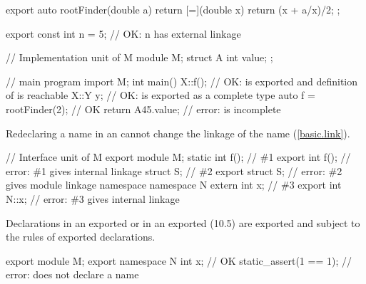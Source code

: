 \begin{std.txt}
\begin{example}
\begin{codeblock}
      export auto rootFinder(double a) {
        return [=](double x) { return (x + a/x)/2; };
      }

      export const int n = 5; // OK: n has external linkage
  
      // Implementation unit of M
      module M;
      struct A {
        int value;
      };
  
      // main program
      import M;
      int main() {
        X::f();                 // OK:  is exported and definition of  is reachable
        X::Y y;                 // OK:  is exported as a complete type
        auto f = rootFinder(2); // OK
        return A{45}.value;     // error:  is incomplete
      }
      \end{codeblock}
  \end{example}

  \alinea
  \enternote
  Redeclaring a name in an 
  cannot change the linkage of the name (\ref{basic.link}).
  \begin{example}
  \begin{codeblock}
    // Interface unit of M
    export module M;
    static int f();             // \#1
    export int f();             // error: \#1 gives internal linkage
    struct S;                   // \#2
    export struct S;            // error: \#2 gives module linkage
    namespace {
      namespace N {
        extern int x;           // \#3
      }
    }
    export int N::x;            // error: \#3 gives internal linkage
  \end{codeblock}
  \end{example}
  \exitnote


  \alinea
  \enternote
  Declarations in an exported  
  or in an exported  (10.5)
  are
  exported and subject to the rules of exported declarations.
  \exitnote
  \begin{example}
    \begin{codeblock}
    export module M;
    export namespace N {
      int x;                    // OK
      static_assert(1 == 1);    // error: does not declare a name
    }
    \end{codeblock}
  \end{example}
\end{std.txt}


